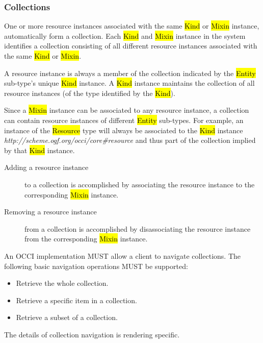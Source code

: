 \documentclass[10pt,a4paper]{article}
\begin{document}
\subsubsection{Collections}
\label{sec:collection}
One or more resource instances associated with the same \hl{Kind} or
\hl{Mixin} instance, automatically form a collection.  Each \hl{Kind}
and \hl{Mixin} instance in the system identifies a collection
consisting of all different resource instances associated with the same
\hl{Kind} or \hl{Mixin}.

A resource instance is always a member of the collection indicated by
the \hl{Entity} sub-type's unique \hl{Kind} instance. A \hl{Kind}
instance maintains the collection of all resource instances (of the
type identified by the \hl{Kind}).

Since a \hl{Mixin} instance can be associated to any resource
instance, a collection can contain resource instances of different
\hl{Entity} sub-types.
For example, an instance of the \hl{Resource} type will always be
associated to the \hl{Kind} instance
\textit{http://scheme.ogf.org/occi/core\#resource} and thus part of
the collection implied by that \hl{Kind} instance.
%
\begin{description}
  \item[Adding a resource instance] to a collection is accomplished by
    associating the resource instance to the corresponding \hl{Mixin}
    instance.
  \item[Removing a resource instance] from a collection is
    accomplished by disassociating the resource instance from the
    corresponding \hl{Mixin} instance.
\end{description}
%
An OCCI implementation MUST allow a client to navigate
collections. The following basic navigation operations MUST be
supported:
%
\begin{itemize}
  \item Retrieve the whole collection.
  \item Retrieve a specific item in a collection.
  \item Retrieve a subset of a collection.
\end{itemize}
%
The details of collection navigation is rendering specific.
\end{document}
